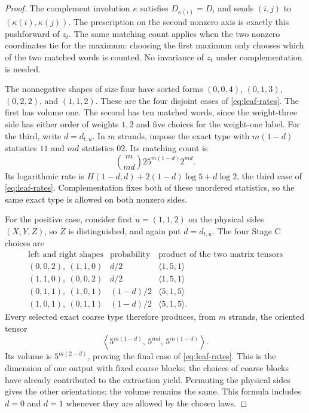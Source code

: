 \begin{proof}
The complement involution $\kappa$ satisfies
$D_{\kappa(i)}=D_i$ and sends $(i,j)$ to
$(\kappa(i),\kappa(j))$.  The prescription on the second nonzero axis
is exactly this pushforward of $z_t$.  The same matching count applies
when the two nonzero coordinates tie for the maximum: choosing the
first maximum only chooses which of the two matched words is counted.
No invariance of $z_t$ under complementation is needed.

The nonnegative shapes of size four have sorted forms
$(0,0,4)$, $(0,1,3)$, $(0,2,2)$, and $(1,1,2)$.
These are the four disjoint cases of \eqref{eq:leaf-rates}.
The first has volume one.  The second has ten matched words, since
the weight-three side has either order of weights $1,2$ and five
choices for the weight-one label.
For the third, write $d=d_{t,u}$.  In $m$ strands, impose the exact
type with $m(1-d)$ statistics $11$ and $md$ statistics $02$.
Its matching count is
\[
 \binom{m}{md}25^{m(1-d)}2^{md}.
\]
Its logarithmic rate is
$H(1-d,d)+2(1-d)\log5+d\log2$, the third case of
\eqref{eq:leaf-rates}.  Complementation fixes both of these unordered
statistics, so the same exact type is allowed on both nonzero sides.

For the positive case, consider first $u=(1,1,2)$ on the physical sides
$(X,Y,Z)$, so $Z$ is distinguished, and again put $d=d_{t,u}$.
The four Stage C choices are
\[
\begin{array}{c|c|c}
 \text{left and right shapes}&\text{probability}&
       \text{product of the two matrix tensors}\\ \hline
 (0,0,2),\ (1,1,0)&d/2&\langle1,5,1\rangle\\
 (1,1,0),\ (0,0,2)&d/2&\langle1,5,1\rangle\\
 (0,1,1),\ (1,0,1)&(1-d)/2&\langle5,1,5\rangle\\
 (1,0,1),\ (0,1,1)&(1-d)/2&\langle5,1,5\rangle.
\end{array}
\]
Every selected exact coarse type therefore produces, from $m$ strands,
the oriented tensor
\begin{equation}
 \left\langle5^{m(1-d)},\,5^{md},\,5^{m(1-d)}\right\rangle.
 \label{eq:positive-leaf-dimensions}
\end{equation}
Its volume is $5^{m(2-d)}$, proving the final case of
\eqref{eq:leaf-rates}.  This is the dimension of one output with fixed
coarse blocks; the choices of coarse blocks have already contributed
to the extraction yield.  Permuting the physical sides gives the other
orientations; the volume remains the same.  This formula includes
$d=0$ and $d=1$ whenever they are allowed by the chosen laws.


\end{proof}
